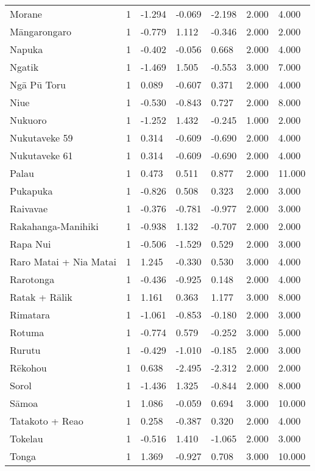 \begin{longtable}{p{4.5cm}p{1.4cm}p{1.4cm}p{1.4cm}p{1.4cm}p{1.7cm}p{1.7cm}}
  Morane & 1 & -1.294 & -0.069 & -2.198 & 2.000 & 4.000 \\ 
  Māngarongaro & 1 & -0.779 & 1.112 & -0.346 & 2.000 & 2.000 \\ 
  Napuka & 1 & -0.402 & -0.056 & 0.668 & 2.000 & 4.000 \\ 
  Ngatik & 1 & -1.469 & 1.505 & -0.553 & 3.000 & 7.000 \\ 
  Ngā Pū Toru & 1 & 0.089 & -0.607 & 0.371 & 2.000 & 4.000 \\ 
  Niue & 1 & -0.530 & -0.843 & 0.727 & 2.000 & 8.000 \\ 
  Nukuoro & 1 & -1.252 & 1.432 & -0.245 & 1.000 & 2.000 \\ 
  Nukutaveke 59 & 1 & 0.314 & -0.609 & -0.690 & 2.000 & 4.000 \\ 
  Nukutaveke 61 & 1 & 0.314 & -0.609 & -0.690 & 2.000 & 4.000 \\ 
  Palau & 1 & 0.473 & 0.511 & 0.877 & 2.000 & 11.000 \\ 
  Pukapuka & 1 & -0.826 & 0.508 & 0.323 & 2.000 & 3.000 \\ 
  Raivavae & 1 & -0.376 & -0.781 & -0.977 & 2.000 & 3.000 \\ 
  Rakahanga-Manihiki & 1 & -0.938 & 1.132 & -0.707 & 2.000 & 2.000 \\ 
  Rapa Nui & 1 & -0.506 & -1.529 & 0.529 & 2.000 & 3.000 \\ 
  Raro Matai + Nia Matai & 1 & 1.245 & -0.330 & 0.530 & 3.000 & 4.000 \\ 
  Rarotonga & 1 & -0.436 & -0.925 & 0.148 & 2.000 & 4.000 \\ 
  Ratak + Rālik & 1 & 1.161 & 0.363 & 1.177 & 3.000 & 8.000 \\ 
  Rimatara & 1 & -1.061 & -0.853 & -0.180 & 2.000 & 3.000 \\ 
  Rotuma & 1 & -0.774 & 0.579 & -0.252 & 3.000 & 5.000 \\ 
  Rurutu & 1 & -0.429 & -1.010 & -0.185 & 2.000 & 3.000 \\ 
  Rēkohou & 1 & 0.638 & -2.495 & -2.312 & 2.000 & 2.000 \\ 
  Sorol & 1 & -1.436 & 1.325 & -0.844 & 2.000 & 8.000 \\ 
  Sāmoa & 1 & 1.086 & -0.059 & 0.694 & 3.000 & 10.000 \\ 
  Tatakoto + Reao & 1 & 0.258 & -0.387 & 0.320 & 2.000 & 4.000 \\ 
  Tokelau & 1 & -0.516 & 1.410 & -1.065 & 2.000 & 3.000 \\ 
  Tonga & 1 & 1.369 & -0.927 & 0.708 & 3.000 & 10.000 \\ 

\end{longtable}
